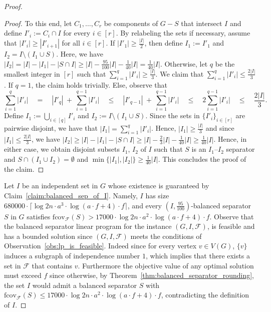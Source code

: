 \documentclass[11pt]{amsart}
\begin{document}
\begin{proof}
\begin{proof}
        To this end, let $C_1,\dots, C_r$ be components of $G-S$ that intersect $I$ and define $I'_i := C_i\cap I$ for every $i\in [r]$. By relabeling the sets if necessary, assume that $|I'_i| \geq |I'_{i+1}|$ for all $i \in [r]$. If $|I'_1| \geq \frac{|I|}{2}$, then define $I_1 := I'_1$ and $I_2 = I\setminus (I_1\cup S)$. Here, we have $|I_2| = |I| - |I_1| - |S\cap I| \geq |I| - \frac{95}{100}|I| - \frac{1}{40}|I| = \frac{1}{40}|I|$. Otherwise, let $q$ be the smallest integer in $[r]$ such that $\sum_{i=1}^{q}|I'_i| \geq \frac{|I|}{3}$. We claim that $\sum_{i=1}^{q}|I'_i| \leq \frac{2|I|}{3}$. If $q = 1$, the claim holds trivially. Else, observe that
        $$
        \sum_{i=1}^{q}|I'_i| \quad
        = \quad |I'_{q}|\ +\ \sum_{i=1}^{q-1}|I'_i| \quad
        \leq \quad |I'_{q-1}|\ +\ \sum_{i=1}^{q-1}|I'_i| \quad
        \leq \quad 2\sum_{i=1}^{q-1}|I'_i| \quad
        \leq \quad \frac{2|I|}{3}.
        $$
        Define $I_1 := \bigcup_{i\in[q]} I'_i$ and $I_2 := I\setminus (I_1\cup S)$. Since the sets in $\{I'_i\}_{i\in [r]}$ are pairwise disjoint, we have that $|I_1| = \sum_{i=1}^{q}|I'_i|$. Hence, $|I_1| \geq \frac{|I|}{3}$ and since $|I_1| \leq \frac{2|I|}{3}$, we have $|I_2| \geq |I| - |I_1| - |S\cap I| \geq |I| - \frac{2}{3}|I| - \frac{1}{40}|I| \geq \frac{1}{40}|I|$. Hence, in either case, we obtain disjoint subsets $I_1$, $I_2$ of $I$ such that $S$ is an $I_1$--$I_2$ separator and $S \cap (I_1 \cup I_2) = \emptyset$ and $\min\{ |I_1|, |I_2|\} \geq \frac{1}{40}|I|$. This concludes the proof of the claim.
    \end{proof}
    
    Let $I$ be an independent set in $G$ whose existence is guaranteed by Claim~\ref{claim:balanced_sep_of_I}. Namely, $I$ has size $680000 \cdot \lceil \log 2n \cdot a^3 \cdot {\log(a\cdot f + 4)} \cdot f \rceil$, and every $(I, \frac{95}{100})$-balanced separator $S$ in $G$ satisfies $\mathrm{fcov}_{\mathcal{F}}(S) > 17000 \cdot \log 2n \cdot a^2 \cdot {\log(a\cdot f + 4)} \cdot f$. {Observe that the balanced separator linear program for the instance $(G, I, \mathcal{F})$, is feasible and has a bounded solution since $(G, I, \mathcal{F})$ meets the conditions of Observation~\ref{obs:lp_is_feasible}. Indeed since for every vertex $v\in V(G)$, $\{v\}$ induces a subgraph of independence number $1$, which implies that there exists a set in $\mathcal{F}$ that contains $v$. Furthermore the objective value of any optimal solution must exceed $f$ since otherwise,} by Theorem~\ref{thm:balanced_separator_rounding}, the set $I$ would admit a balanced separator $S$ with $\mathrm{fcov}_{\mathcal{F}}(S) \leq 17000 \cdot \log 2n \cdot a^2 \cdot {\log(a\cdot f + 4)} \cdot f$, contradicting the definition of $I$. 


\end{proof}
\end{document}
